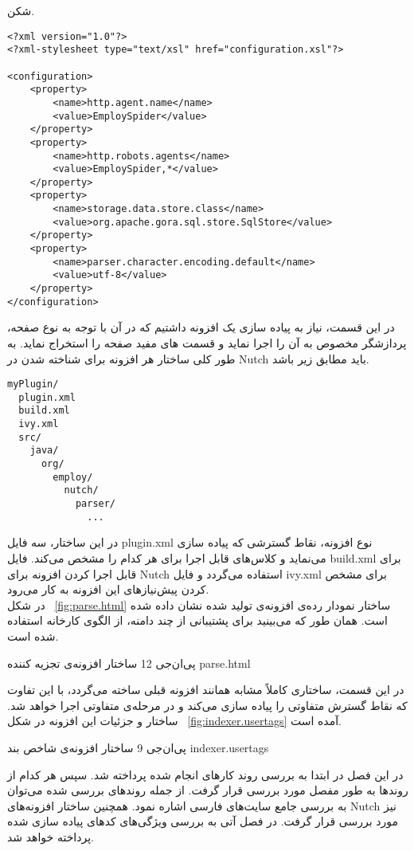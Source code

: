 ‌شکن.

\begin{latin} 
\begin{lstlisting}[style=listXML]
<?xml version="1.0"?>
<?xml-stylesheet type="text/xsl" href="configuration.xsl"?>

<configuration>
	<property>
		<name>http.agent.name</name>
		<value>EmploySpider</value>
	</property>
	<property>
		<name>http.robots.agents</name>
		<value>EmploySpider,*</value>
	</property>
	<property>
		<name>storage.data.store.class</name>
		<value>org.apache.gora.sql.store.SqlStore</value>
	</property>
	<property>
		<name>parser.character.encoding.default</name>
		<value>utf-8</value>
	</property>
</configuration>
\end{lstlisting}
\end{latin}
در این قسمت، نیاز به پیاده سازی یک افزونه داشتیم که در آن با توجه به نوع صفحه، پردازشگر مخصوص به آن را اجرا نماید و قسمت های مفید صفحه را استخراج نماید. به طور کلی ساختار هر افزونه برای شناخته شدن در Nutch باید مطابق زیر باشد.
\begin{latin}
\begin{verbatim}
myPlugin/
  plugin.xml
  build.xml
  ivy.xml
  src/
    java/
      org/
        employ/
          nutch/
            parser/
              ...
\end{verbatim}
\end{latin}
در این ساختار، سه فایل plugin.xml نوع افزونه، نقاط گسترشی که پیاده سازی می‌نماید و کلاس‌های قابل اجرا برای هر کدام را مشخص می‌کند. فایل build.xml برای قابل اجرا کردن افزونه برای Nutch استفاده می‌گردد و فایل ivy.xml برای مشخص کردن پیش‌نیازهای این افزونه به کار می‌رود. 
\\
در شکل ~\ref {fig:parse.html} ساختار نمودار رده‌ی افزونه‌ی تولید شده نشان داده شده است. همان طور که می‌بینید برای پشتیبانی از چند دامنه، از الگوی کارخانه استفاده شده است.

‌پی‌ان‌جی {12} {ساختار افزونه‌ی تجزیه کننده} {parse.html}

در این قسمت، ساختاری کاملاً مشابه همانند افزونه قبلی ساخته می‌گردد، با این تفاوت که نقاط گسترش متفاوتی را پیاده سازی می‌کند و در مرحله‌ی متفاوتی اجرا خواهد شد. ساختار و جزئیات این افزونه در شکل ~\ref {fig:indexer.usertags} آمده است.

‌پی‌ان‌جی {9} {ساختار افزونه‌ی شاخص بند} {indexer.usertags}

در این فصل در ابتدا به بررسی روند کارهای انجام شده پرداخته شد. سپس هر کدام از روند‌ها به طور مفصل مورد بررسی قرار گرفت. از جمله روندهای بررسی شده می‌توان به بررسی جامع سایت‌های فارسی اشاره نمود. همچنین ساختار افزونه‌های Nutch نیز مورد بررسی قرار گرفت. در فصل آتی به بررسی ویژگی‌های کدهای پیاده سازی شده پرداخته خواهد شد.
